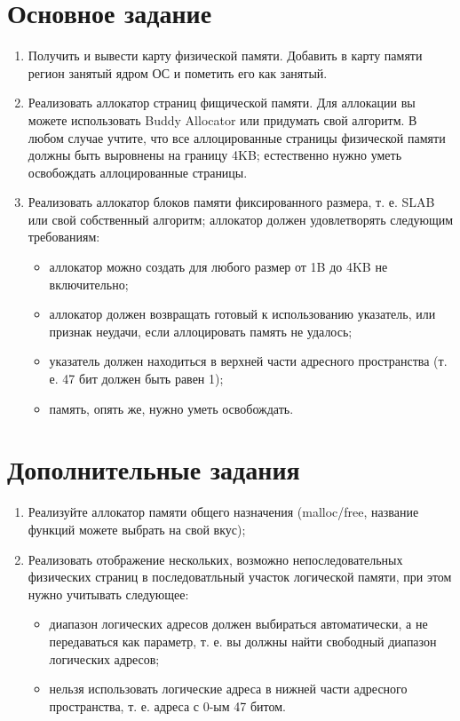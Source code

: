 \section{Основное задание}

\begin{enumerate}
  \item Получить и вывести карту физической памяти. Добавить в карту памяти
  регион занятый ядром ОС и пометить его как занятый.
  \item Реализовать аллокатор страниц фищической памяти. Для аллокации вы можете
  использовать Buddy Allocator или придумать свой алгоритм. В любом случае
  учтите, что все аллоцированные страницы физической памяти должны быть
  выровнены на границу 4KB; естественно нужно уметь освобождать аллоцированные
  страницы.
  \item Реализовать аллокатор блоков памяти фиксированного размера, т. е. SLAB
  или свой собственный алгоритм; аллокатор должен удовлетворять следующим
  требованиям:
  \begin{itemize}
    \item аллокатор можно создать для любого размер от 1B до 4KB не
    включительно;
    \item аллокатор должен возвращать готовый к использованию указатель, или
    признак неудачи, если аллоцировать память не удалось;
    \item указатель должен находиться в верхней части адресного пространства (т.
    е. 47 бит должен быть равен 1);
    \item память, опять же, нужно уметь освобождать.
  \end{itemize}
\end{enumerate}

\section{Дополнительные задания}

\begin{enumerate}
  \item Реализуйте аллокатор памяти общего назначения (malloc/free, название
  функций можете выбрать на свой вкус);
  \item Реализовать отображение нескольких, возможно непоследовательных
  физических страниц в последоватльный участок логической памяти, при этом нужно
  учитывать следующее:
  \begin{itemize}
    \item диапазон логических адресов должен выбираться автоматически, а не
    передаваться как параметр, т. е. вы должны найти свободный диапазон
    логических адресов;
    \item нельзя использовать логические адреса в нижней части адресного
    пространства, т. е. адреса с 0-ым 47 битом.
  \end{itemize}
\end{enumerate}

